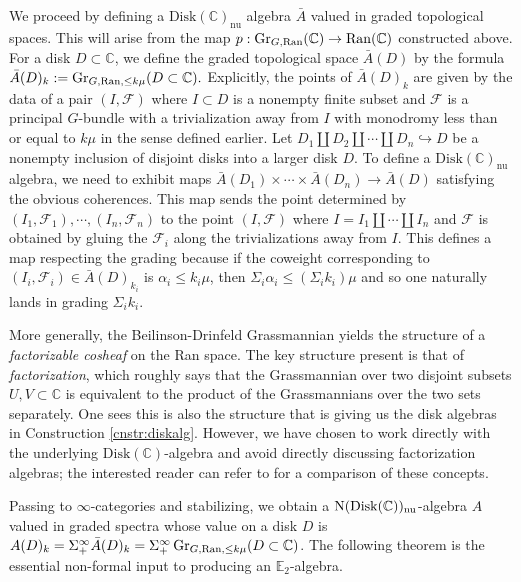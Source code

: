 \begin{cnstr}\label{cnstr:diskalg}
We proceed by defining a $\mathrm{Disk}(\mathbb{C})_{\mathrm{nu}}$ algebra $\bar{A}$ valued in graded topological spaces.  This will arise from the map $p:\operatorname{\mathrm{Gr}}_{G,\operatorname{\mathrm{Ran}}}(\mathbb{C}) \to \operatorname{\mathrm{Ran}}(\mathbb{C})$ constructed above.  For a disk $D\subset \mathbb{C}$, we define the graded topological space $\bar{A}(D)$ by the formula $\bar{A}(D)_k := \operatorname{\mathrm{Gr}}_{G,\operatorname{\mathrm{Ran}}, \leq k\mu}(D\subset \mathbb{C}).$  Explicitly, the points of $\bar{A}(D)_k$ are given by the data of a pair $(I, \mathcal{F})$ where $I\subset D$ is a nonempty finite subset and $\mathcal{F}$ is a principal $G$-bundle with a trivialization away from $I$ with monodromy less than or equal to $k\mu$ in the sense defined earlier.  Let $D_1 \coprod D_2\coprod \cdots \coprod D_n \hookrightarrow D$ be a nonempty inclusion of disjoint disks into a larger disk $D$.  To define a $\mathrm{Disk}(\mathbb{C})_{\mathrm{nu}}$ algebra, we need to exhibit maps $\bar{A}(D_1)\times \cdots \times \bar{A}(D_n) \to \bar{A}(D)$ satisfying the obvious coherences.  %
This map sends the point determined by $(I_1, \mathcal{F}_1), \cdots, (I_n, \mathcal{F}_n)$ to the point $(I, \mathcal{F})$ where $I= I_1 \coprod \cdots \coprod I_n$ and $\mathcal{F}$ is obtained by gluing the $\mathcal{F}_i$ along the trivializations away from $I$.  This defines a map respecting the grading because if the coweight corresponding to $(I_i,\mathcal{F}_i) \in \bar{A}(D)_{k_i}$ is $\alpha_i\leq k_i \mu$, then $\Sigma_i \alpha_i \leq (\Sigma_i k_i) \mu$ and so one naturally lands in grading $\Sigma_i k_i$.  
\end{cnstr}
\begin{rmk}
More generally, the Beilinson-Drinfeld Grassmannian yields the structure of a \emph{factorizable cosheaf} on the Ran space.  The key structure present is that of \emph{factorization}, which roughly says that the Grassmannian over two disjoint subsets $U,V\subset \mathbb{C}$ is equivalent to the product of the Grassmannians over the two sets separately.  One sees this is also the structure that is giving us the disk algebras in Construction \ref{cnstr:diskalg}.  However, we have chosen to work directly with the underlying $\mathrm{Disk}(\mathbb{C})$-algebra and avoid directly discussing factorization algebras; the interested reader can refer to \cite[\S 5.5.4.10]{HA} for a comparison of these concepts.  
\end{rmk}

Passing to $\infty$-categories and stabilizing, we obtain a $\operatorname{\mathrm{N}}(\mathrm{Disk}(\mathbb{C}))_{\mathrm{nu}}$-algebra $A$ valued in graded spectra whose value on a disk $D$ is $A(D)_k = \Sigma^{\infty}_+ \bar{A}(D)_k = \Sigma^{\infty}_+ \operatorname{\mathrm{Gr}}_{G,\operatorname{\mathrm{Ran}},\leq k\mu }(D\subset \mathbb{C})$.  The following theorem is the essential non-formal input to producing an $\mathbb{E}_2$-algebra.  

